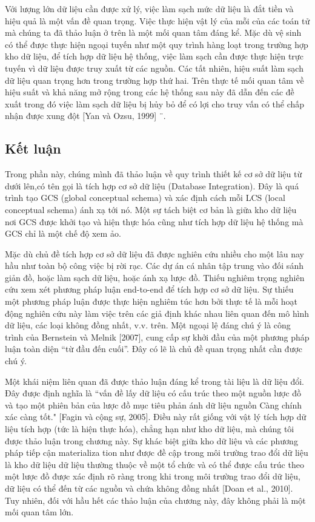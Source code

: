 \documentclass[a4paper]{article}
\begin{document}
Với lượng lớn dữ liệu cần được xử lý, việc làm sạch mức dữ liệu là
đắt tiền và hiệu quả là một vấn đề quan trọng. Việc thực hiện vật lý của mỗi
của các toán tử mà chúng ta đã thảo luận ở trên là một mối quan tâm đáng kể. Mặc dù vệ sinh có thể
được thực hiện ngoại tuyến như một quy trình hàng loạt trong trường hợp kho dữ liệu, để tích hợp dữ liệu
hệ thống, việc làm sạch cần được thực hiện trực tuyến vì dữ liệu được truy xuất từ ​​các nguồn. Các
tất nhiên, hiệu suất làm sạch dữ liệu quan trọng hơn trong trường hợp thứ hai. Trên thực tế
mối quan tâm về hiệu suất và khả năng mở rộng trong các hệ thống sau này đã dẫn đến các đề xuất
trong đó việc làm sạch dữ liệu bị hủy bỏ để có lợi cho truy vấn có thể chấp nhận được xung đột [Yan
và Ozsu, 1999] ¨.

\subsection{Kết luận}
Trong phần này, chúng mình đã thảo luận về quy trình thiết kế cơ sở dữ liệu từ dưới lên,có tên gọi là
tích hợp cơ sở dữ liệu (Database Integration). Đây là quá trình tạo GCS (global conceptual schema)
và xác định cách mỗi LCS (local conceptual schema) ánh xạ tới nó. Một sự tách biệt cơ bản là giữa
kho dữ liệu nơi GCS được khởi tạo và hiện thực hóa cũng như tích hợp dữ liệu
hệ thống mà GCS chỉ là một chế độ xem ảo.

Mặc dù chủ đề tích hợp cơ sở dữ liệu đã được nghiên cứu nhiều cho một
lâu nay hầu như toàn bộ công việc bị rời rạc. Các dự án cá nhân tập trung vào
đối sánh giản đồ, hoặc làm sạch dữ liệu, hoặc ánh xạ lược đồ. Thiếu nghiêm trọng
nghiên cứu xem xét phương pháp luận end-to-end để tích hợp cơ sở dữ liệu. Sự thiếu
một phương pháp luận được thực hiện nghiêm túc hơn bởi thực tế là mỗi hoạt động nghiên cứu này
làm việc trên các giả định khác nhau liên quan đến mô hình dữ liệu, các loại không đồng nhất, v.v.
trên. Một ngoại lệ đáng chú ý là công trình của Bernstein và Melnik [2007], cung cấp
sự khởi đầu của một phương pháp luận toàn diện “từ đầu đến cuối”. Đây có lẽ là
chủ đề quan trọng nhất cần được chú ý.

Một khái niệm liên quan đã được thảo luận đáng kể trong tài liệu là dữ liệu
đổi. Đây được định nghĩa là “vấn đề lấy dữ liệu có cấu trúc theo một nguồn
lược đồ và tạo một phiên bản của lược đồ mục tiêu phản ánh dữ liệu nguồn
Càng chính xác càng tốt." [Fagin và cộng sự, 2005]. Điều này rất giống với vật lý
tích hợp dữ liệu tích hợp (tức là hiện thực hóa), chẳng hạn như kho dữ liệu, mà chúng tôi
được thảo luận trong chương này. Sự khác biệt giữa kho dữ liệu và các phương pháp tiếp cận materializa tion như được đề cập trong môi trường trao đổi dữ liệu là kho dữ liệu
dữ liệu thường thuộc về một tổ chức và có thể được cấu trúc theo một lược đồ được xác định rõ ràng trong khi trong môi trường trao đổi dữ liệu, dữ liệu có thể đến từ các
nguồn và chứa không đồng nhất [Doan et al., 2010]. Tuy nhiên, đối với hầu hết các
thảo luận của chương này, đây không phải là một mối quan tâm lớn.
\end{document}

